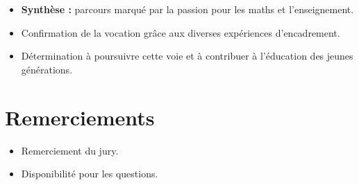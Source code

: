 \begin{itemize}
    \item \textbf{Synthèse :} parcours marqué par la passion pour les maths et l'enseignement.
    \item Confirmation de la vocation grâce aux diverses expériences d'encadrement.
    \item Détermination à poursuivre cette voie et à contribuer à l'éducation des jeunes générations.
\end{itemize}

\section*{Remerciements}

\begin{itemize}
    \item Remerciement du jury.
    \item Disponibilité pour les questions.
\end{itemize}